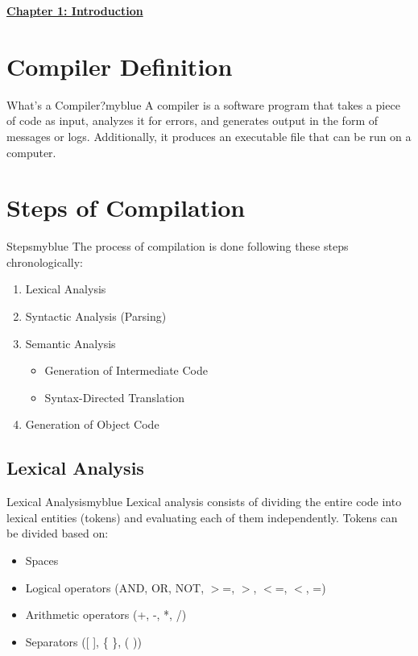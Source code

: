 \begin{center}
    \Huge{\textbf{\underline{Chapter 1: Introduction}}}
\end{center}

\setcounter{section}{0}

\vspace{0.35cm}


\section{Compiler Definition}

\begin{prettyBox}{What's a Compiler?}{myblue}
A compiler is a software program that takes a piece of code as input, analyzes
it for errors, and generates output in the form of messages or logs.
Additionally, it produces an executable file that can be run on a computer.
\end{prettyBox}

\vspace{0.25cm}
\section{Steps of Compilation}
\begin{prettyBox}{Steps}{myblue}
The process of compilation is done following these steps chronologically:
\begin{enumerate}
    \item Lexical Analysis
    \item Syntactic Analysis (Parsing)
    \item Semantic Analysis
        \begin{itemize}
            \item Generation of Intermediate Code
            \item Syntax-Directed Translation
        \end{itemize}
    \item Generation of Object Code
\end{enumerate}
\end{prettyBox}

\vspace{0.25cm}

\subsection{Lexical Analysis}
\begin{prettyBox}{Lexical Analysis}{myblue}
Lexical analysis consists of dividing the entire code into lexical entities (tokens) and evaluating each of them independently. Tokens can be divided based on:
\begin{itemize}
    \item Spaces
    \item Logical operators (AND, OR, NOT, \(>\)=, \(>\), \(<\)=, \(<\), =)
    \item Arithmetic operators (+, -, *, /)
    \item Separators ([ ], \{ \}, ( ))
\end{itemize}
\end{prettyBox}

